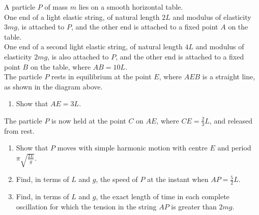 \documentclass[leqno]{article}
\begin{document}
\begin{enumerate}[
  label=\textbf{\arabic*.},
  leftmargin=*,
  topsep=0pt,
  partopsep=0pt,
  parsep=0pt
]
\begin{figure}[H]
\end{figure}


A particle $P$ of mass $m$ lies on a smooth horizontal table. \\
One end of a light elastic string, of natural length $2L$ and modulus of elasticity $3mg$, is attached to $P$, and the other end is attached to a fixed point $A$ on the table. \\
One end of a second light elastic string, of natural length $4L$ and modulus of elasticity $2mg$, is also attached to $P$, and the other end is attached to a fixed point $B$ on the table, where $AB=10L$. \\
The particle $P$ rests in equilibrium at the point $E$, where $AEB$ is a straight line, as shown in the diagram above. \\
\begin{enumerate}[label=\textbf{(\alph*)}]
\item Show that $AE=3L$.  \\
\end{enumerate}
The particle $P$ is now held at the point $C$ on $AE$, where $CE=\frac{2}{3}L$, and released from rest. \\
\begin{enumerate}[label=\textbf{(\alph*)}, resume]
\item Show that $P$ moves with simple harmonic motion with centre $E$ and period $\pi\sqrt{\frac{2L}{g}}$.  \\
\item Find, in terms of $L$ and $g$, the speed of $P$ at the instant when $AP=\frac{5}{2}L$.  \\
\item Find, in terms of $L$ and $g$, the exact length of time in each complete oscillation for which the tension in the string $AP$ is greater than $2mg$.  \\
\end{enumerate}


\end{enumerate}
\end{document}
